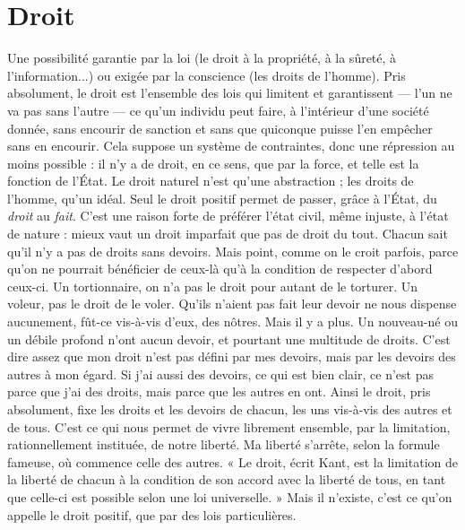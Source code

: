 
\section{Droit}
Une possibilité garantie par la loi (le droit à la propriété, à la sûreté,
à l'information...) ou exigée par la conscience (les droits de
l’homme). Pris absolument, le droit est l’ensemble des lois qui limitent et
garantissent — l’un ne va pas sans l’autre — ce qu’un individu peut faire, à l’intérieur
d’une société donnée, sans encourir de sanction et sans que quiconque
puisse l’en empêcher sans en encourir. Cela suppose un système de contraintes,
donc une répression au moins possible : il n’y a de droit, en ce sens, que par la
force, et telle est la fonction de l’État. Le droit naturel n’est qu’une abstraction ;
les droits de l’homme, qu’un idéal. Seul le droit positif permet de passer, grâce
à l'État, du {\it droit} au {\it fait}. C’est une raison forte de préférer l’état civil, même
injuste, à l’état de nature : mieux vaut un droit imparfait que pas de droit du
tout.
Chacun sait qu’il n’y a pas de droits sans devoirs. Mais point, comme on le
croit parfois, parce qu’on ne pourrait bénéficier de ceux-là qu’à la condition de
respecter d’abord ceux-ci. Un tortionnaire, on n’a pas le droit pour autant de le
torturer. Un voleur, pas le droit de le voler. Qu'ils n’aient pas fait leur devoir
ne nous dispense aucunement, fût-ce vis-à-vis d’eux, des nôtres. Mais il y a
plus. Un nouveau-né ou un débile profond n’ont aucun devoir, et pourtant
une multitude de droits. C’est dire assez que mon droit n’est pas défini par mes
devoirs, mais par les devoirs des autres à mon égard. Si j’ai aussi des devoirs, ce
qui est bien clair, ce n’est pas parce que j’ai des droits, mais parce que les autres
en ont. Ainsi le droit, pris absolument, fixe les droits et les devoirs de chacun,
les uns vis-à-vis des autres et de tous. C’est ce qui nous permet de vivre librement
ensemble, par la limitation, rationnellement instituée, de notre liberté.
Ma liberté s’arrête, selon la formule fameuse, où commence celle des autres.
« Le droit, écrit Kant, est la limitation de la liberté de chacun à la condition de
son accord avec la liberté de tous, en tant que celle-ci est possible selon une loi
universelle. » Mais il n’existe, c’est ce qu’on appelle le droit positif, que par des
lois particulières.

